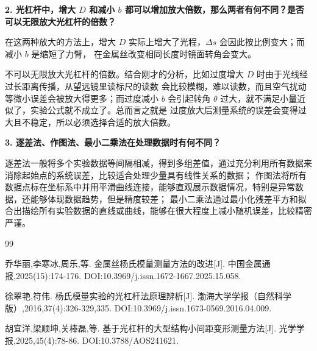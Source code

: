\documentclass{Phyport}
\begin{document}
\textbf{2. 光杠杆中，增大 $D$ 和减小 $b$ 都可以增加放大倍数，那么两者有何不同？是否可以无限放大光杠杆的倍数？}

在这两种放大的方法上，增大 $D$ 实际上增大了光程，$\Delta s$ 会因此按比例变大；而减小 $b$ 是缩短了力臂，
在金属丝改变相同长度时镜面转角会变大。

不可以无限放大光杠杆的倍数。结合刚才的分析，比如过度增大 $D$ 时由于光线经过长距离传播，从望远镜里读标尺的读数
会比较模糊，难以读数，而且空气扰动等微小误差会被放大得更多；而过度减小 $b$ 会引起转角 $\theta$ 过大，就不满足小量近似了，实验公式就不成立了。总而言之就是
过度放大后测量系统的误差会变得过大且不稳定，所以必须选择合适的放大倍数。 

\textbf{3. 逐差法、作图法、最小二乘法在处理数据时有何不同？}

逐差法一般将多个实验数据等间隔相减，得到多组差值，通过充分利用所有数据来消除起始点的系统误差，比较适合处理少量具有线性关系的数据；
作图法将所有数据点标在坐标系中并用平滑曲线连接，能够直观展示数据情况，特别是异常数据，还能够体现数据趋势，但是精度较差；
最小二乘法通过最小化残差平方和拟合出描绘所有实验数据的直线或曲线，能够在很大程度上减小随机误差，比较精密严谨。

\renewcommand\refname{参考文献:}

\begin{thebibliography}{99} %

  乔华丽,李寒冰,周乐,等. 金属丝杨氏模量测量方法的改进[J]. 中国金属通报,2025(15):174-176. DOI:10.3969/j.issn.1672-1667.2025.15.058. 

  徐翠艳,符伟. 杨氏模量实验的光杠杆法原理辨析[J]. 渤海大学学报（自然科学版）,2016,37(4):326-329,335. DOI:10.3969/j.issn.1673-0569.2016.04.009. 

  胡宜洋,梁顺坤,关棒磊,等. 基于光杠杆的大型结构小间距变形测量方法[J]. 光学学报,2025,45(4):78-86. DOI:10.3788/AOS241621. 

\end{thebibliography}


\end{document}
